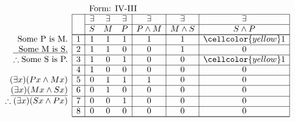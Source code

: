 \documentclass[10pt,legalpaper,landscape,cmtt]{article}
\begin{document}
{\begin{minipage}[t]{3.25in}
	\(
	\begin{array}{r|c|ccc|c|c|c|}
		\multicolumn{2}{c}{}&\multicolumn{6}{l}{\mbox{Form: IV-III}} \\ \cline{2-8}
		\hspace{1in}	&	& \exists & \exists & \exists & \exists & \exists & \exists\\ \cline{3-8}
		&	& S & M & P &  P \wedge M  &  M \wedge S  &  S \wedge P \\ \cline{2-8} \cline{2-8}
		\phantom{\therefore}\mbox{Some P is M.}   & 1 & 1 & 1 & 1 &   1   &   1   &   \cellcolor{yellow} 1  \\ \cline{2-8}
		\underline{\phantom{\therefore}\mbox{Some M is S.}}   & 2 & 1 & 1 & 0 &   0   &   1   &   0  \\ \cline{2-8}
		\therefore \mbox{Some S is P.}   & 3 & 1 & 0 & 1 &   0   &   0   &   \cellcolor{yellow} 1  \\ \cline{2-8}
		& 4 & 1 & 0 & 0 &   0   &   0   &   0  \\ \cline{2-8}
		(\exists x)(Px \wedge Mx)   & 5 & 0 & 1 & 1 &   1   &   0   &   0  \\ \cline{2-8}
		\underline{(\exists x)(Mx \wedge Sx)}   & 6 & 0 & 1 & 0 &   0   &   0   &   0  \\ \cline{2-8}
		\therefore(\exists x)(Sx \wedge Px)   & 7 & 0 & 0 & 1 &   0   &   0   &   0  \\ \cline{2-8}
		& 8 & 0 & 0 & 0 &   0   &   0   &   0   \\ \cline{2-8}\cline{2-8} 
	\end{array}
	\)
\end{minipage}

}
\end{document}
